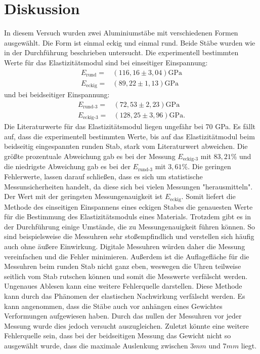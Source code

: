 \section{Diskussion}
\label{sec:Diskussion}
In diesem Versuch wurden zwei Aluminiumstäbe mit verschiedenen Formen ausgewählt.
Die Form ist einmal eckig und einmal rund.
Beide Stäbe wurden wie in der Durchführung beschrieben untersucht.
Die experimentell bestimmten Werte für das Elastizitätsmodul sind bei einseitiger Einspannung:
\begin{align*}
    E_{\text{rund}}=&(116,16\pm3,04)\si{\giga\pascal}\\
    E_{\text{eckig}}=&(89,22\pm1,13)\si{\giga\pascal}
 \end{align*}
und bei beidseitiger Einspannung:
\begin{align*}
    E_{\text{rund-3}}=&(72,53\pm2,23)\si{\giga\pascal}\\
    E_{\text{eckig-3}}=&(128,25\pm3,96)\si{\giga\pascal} \text{.}
 \end{align*}
Die Literaturwerte für das Elastizitätsmodul \cite{Elastizität} liegen ungefähr bei 70 GPa. 
Es fällt auf, dass die experimentell bestimmten Werte, bis auf das Elastizitätmodul beim beidseitig eingespannten runden Stab, stark vom Literaturwert abweichen.
Die größte prozentuale Abweichung gab es bei der Messung $E_{\text{eckig-3}}$ mit $83,21\%$ und die niedrigste Abweichung gab es bei der $E_{\text{rund-3}}$ mit $3,61\%$.
Die geringen Fehlerwerte, lassen darauf schließen, dass es sich um statistische Messunsicherheiten handelt, da diese sich bei vielen Messungen "herausmitteln".
Der Wert mit der geringsten Messungenauigkeit ist $E_{\text{eckig}}$. 
Somit liefert die Methode des einseitigen Einspannens eines eckigen Stabes die genauesten Werte für die Bestimmung des Elastizitätsmoduls eines Materials.
Trotzdem gibt es in der Durchführung einige Umstände, die zu Messungenauigkeit führen können.
So sind beispielsweise die Messuhren sehr stoßempfindlich und verstellen sich häufig auch ohne äußere Einwirkung.
Digitale Messuhren würden daher die Messung vereinfachen und die Fehler minimieren.
Außerdem ist die Auflagefläche für die Messuhren beim runden Stab nicht ganz eben, weswegen die Uhren teilweise seitlich vom Stab rutschen können und somit die Messwerte verfälscht werden.
Ungenaues Ablesen kann eine weitere Fehlerquelle darstellen.
Diese Methode kann durch das Phänomen der elastischen Nachwirkung verfälscht werden.
Es kann angenommen, dass die Stäbe auch vor anhängen eines Gewichtes Verformungen aufgewiesen haben.
Durch das nullen der Messuhren vor jeder Messung wurde dies jedoch versucht auszugleichen.
Zuletzt könnte eine weitere Fehlerquelle sein, dass bei der beidseitigen Messung das Gewicht nicht so ausgewählt wurde, dass die maximale Auslenkung zwischen $3 \unit{mm}$ und $7 \unit{mm}$ liegt.





